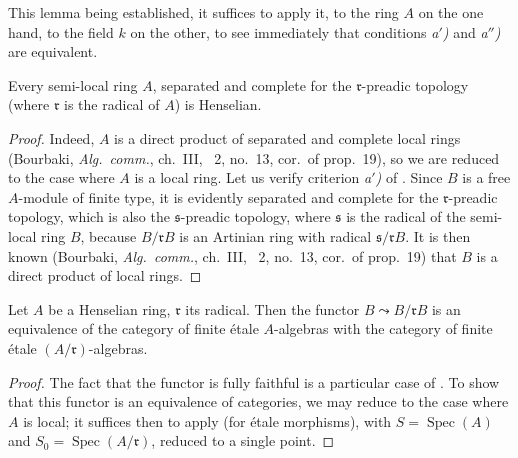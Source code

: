 This lemma being established, it suffices to apply it, to the ring $A$ on the one hand, to the field $k$ on the other, to see immediately that conditions \emph{a$'$)} and \emph{a$''$)} are equivalent.

\begin{proposition}[18.5.14]
\label{IV.18.5.14}
Every semi-local ring $A$, separated and complete for the $\mathfrak{r}$-preadic topology \textup{(}where $\mathfrak{r}$ is the radical of $A$\textup{)} is Henselian.
\end{proposition}

\begin{proof}
Indeed, $A$ is a direct product of separated and complete local rings (Bourbaki, \emph{Alg.\ comm.}, ch.~III, \textsection~2, no.~13, cor.\ of prop.~19), so we are reduced to the case where $A$ is a local ring.
Let us verify criterion \emph{a$'$)} of .
Since $B$ is a free $A$-module of finite type, it is evidently separated and complete for the $\mathfrak{r}$-preadic topology, which is also the $\mathfrak{s}$-preadic topology, where $\mathfrak{s}$ is the radical of the semi-local ring $B$, because $B/\mathfrak{r}B$ is an Artinian ring with radical $\mathfrak{s}/\mathfrak{r}B$.
It is then known (Bourbaki, \emph{Alg.\ comm.}, ch.~III, \textsection~2, no.~13, cor.\ of prop.~19) that $B$ is a direct product of local rings.
\end{proof}

\begin{proposition}[18.5.15]
\label{IV.18.5.15}
Let $A$ be a Henselian ring, $\mathfrak{r}$ its radical.
Then the functor $B\leadsto B/\mathfrak{r}B$ is an equivalence of the category of finite \'etale $A$-algebras with the category of finite \'etale $(A/\mathfrak{r})$-algebras.
\end{proposition}

\begin{proof}
The fact that the functor is fully faithful is a particular case of .
To show that this functor is an equivalence of categories, we may reduce to the case where $A$ is local;
it suffices then to apply  (for \'etale morphisms), with $S=\operatorname{Spec}(A)$ and $S_0=\operatorname{Spec}(A/\mathfrak{r})$, reduced to a single point.
\end{proof}

